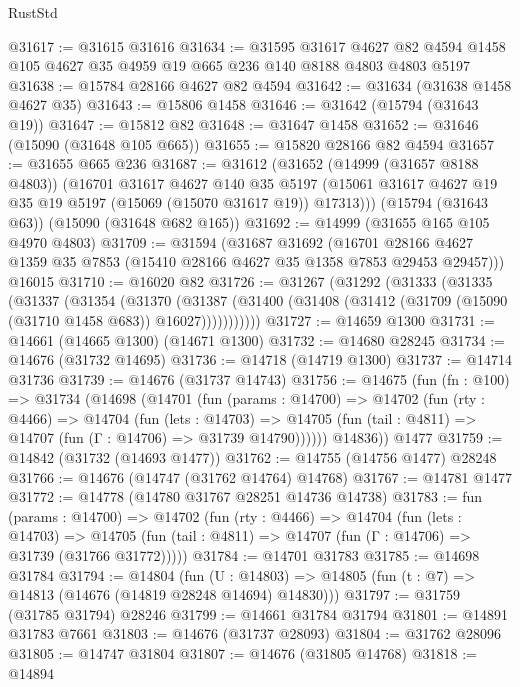 \begin{lexlean}{RustStd}
\begin{coremodule}
@31617 := @31615 @31616
@31634 := @31595
    @31617
    @4627
    @82
    @4594
    @1458
    @105
    @4627
    @35
    @4959
    @19
    @665
    @236
    @140
    @8188
    @4803
    @4803
    @5197
@31638 := @15784 @28166 @4627 @82 @4594
@31642 := @31634 (@31638 @1458 @4627 @35)
@31643 := @15806 @1458
@31646 := @31642 (@15794 (@31643 @19))
@31647 := @15812 @82
@31648 := @31647 @1458
@31652 := @31646 (@15090 (@31648 @105 @665))
@31655 := @15820 @28166 @82 @4594
@31657 := @31655 @665 @236
@31687 := @31612
    (@31652
      (@14999 (@31657 @8188 @4803))
      (@16701
        @31617
        @4627
        @140
        @35
        @5197
        (@15061 @31617 @4627 @19 @35 @19 @5197 (@15069 (@15070 @31617 @19)) @17313)))
    (@15794 (@31643 @63))
    (@15090 (@31648 @682 @165))
@31692 := @14999 (@31655 @165 @105 @4970 @4803)
@31709 := @31594
    (@31687
      @31692
      (@16701 @28166 @4627 @1359 @35 @7853 (@15410 @28166 @4627 @35 @1358 @7853 @29453 @29457)))
    @16015
@31710 := @16020 @82
@31726 := @31267
    (@31292
      (@31333
        (@31335
          (@31337
            (@31354
              (@31370
                (@31387
                  (@31400 (@31408 (@31412 (@31709 (@15090 (@31710 @1458 @683)) @16027)))))))))))
@31727 := @14659 @1300
@31731 := @14661 (@14665 @1300) (@14671 @1300)
@31732 := @14680 @28245
@31734 := @14676 (@31732 @14695)
@31736 := @14718 (@14719 @1300)
@31737 := @14714 @31736
@31739 := @14676 (@31737 @14743)
@31756 := @14675
    (fun (fn : @100) =>
    @31734
      (@14698
        (@14701
          (fun (params : @14700) =>
          @14702
            (fun (rty : @4466) =>
            @14704
              (fun (lets : @14703) =>
              @14705 (fun (tail : @4811) => @14707 (fun (Γ : @14706) => @31739 @14790))))))
        @14836))
    @1477
@31759 := @14842 (@31732 (@14693 @1477))
@31762 := @14755 (@14756 @1477) @28248
@31766 := @14676 (@14747 (@31762 @14764) @14768)
@31767 := @14781 @1477
@31772 := @14778 (@14780 @31767 @28251 @14736 @14738)
@31783 := fun (params : @14700) =>
  @14702
    (fun (rty : @4466) =>
    @14704
      (fun (lets : @14703) =>
      @14705 (fun (tail : @4811) => @14707 (fun (Γ : @14706) => @31739 (@31766 @31772)))))
@31784 := @14701 @31783
@31785 := @14698 @31784
@31794 := @14804
    (fun (U : @14803) => @14805 (fun (t : @7) => @14813 (@14676 (@14819 @28248 @14694) @14830)))
@31797 := @31759 (@31785 @31794) @28246
@31799 := @14661 @31784 @31794
@31801 := @14891 @31783 @7661
@31803 := @14676 (@31737 @28093)
@31804 := @31762 @28096
@31805 := @14747 @31804
@31807 := @14676 (@31805 @14768)
@31818 := @14894

\end{coremodule}
\end{lexlean}
